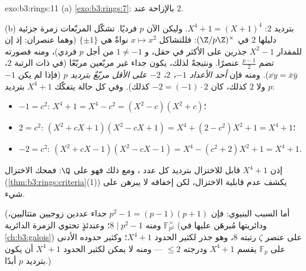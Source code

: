 \begin{solution}{exo:b3:rings:11}
(a) \cref{exo:b3:rings:7}: بالإزاحة  عند $2$.

(b) بترديد $2$: $X^4 + 1 = (X + 1)^4$. وليكن الآن $p$ فرديًا. تشكّل المربّعات
زمرة جزئية دليلها $2$ في $(\Z/p\Z)^\times$: فللتشاكل $x \mapsto x^2$ نواةٌ
هي $\{\pm 1\}$ (وهما عنصران: إذ إن للمقدار $X^2
- 1$ جذرين على الأكثر
في حقل، و $1 \neq -1$ من أجل $p$ فردي)، ومنه فصورته تضم
$\frac{p-1}2$ عنصرًا. ونتيجةً لذلك، يكون جداء غير مربّعين
مربّعًا (في  ذات الرتبة $2$، $\overline{xy} = \bar x\bar y$). ومنه فإن
\emph{أحد الأعداد $-1$، $2$، $-2$ على الأقل مربّعٌ بترديد $p$}
(فإذا لم يكن $-1$ ولا $2$ كذلك، كان $-2 = (-1)\cdot 2$ كذلك). وفي كل حالة
يتفكّك $X^4 + 1$ بترديد $p$:
\begin{itemize}
  \item $-1 = c^2$: \quad $X^4 + 1 = X^4 - c^2 = (X^2 - c)(X^2 +
        c)$؛
  \item $2 = c^2$: \quad $(X^2 + cX + 1)(X^2 - cX + 1) = X^4 + (2
        - c^2)X^2 + 1 = X^4 + 1$؛
  \item $-2 = c^2$: \quad $(X^2 + cX - 1)(X^2 - cX - 1) = X^4 -
        (c^2 + 2)X^2 + 1 = X^4 + 1$.
\end{itemize}
إذن $X^4+1$ قابل للاختزال بترديد كل عدد ، ومع ذلك فهو  على $\Q$: فمحك الاختزال (\cref{thm:b3:rings:criteria}(1)) يكشف
عدم قابلية الاختزال، لكن إخفاقه لا يبرهن على شيء.

(أما السبب البنيوي: فإن $p^2 - 1 = (p-1)(p+1)$ جداء عددين زوجيين متتاليين،
ومنه $8 \mid p^2 - 1$؛ وعندئذٍ تحتوي الزمرة الدائرية $\mathbb F_{p^2}^\times$
(ودائريتها مُبرهَن عليها في \cref{ch:b3:galois}) على عنصر $\zeta$ رتبته
$8$، وهو جذر لكثير الحدود $X^4 + 1$؛ وكثير حدوده الأدنى على $\mathbb
F_p$ يقسم
$X^4+1$ ودرجته $\leq 2$ --- ومنه لا يمكن لكثير الحدود $X^4+1$ أن يكون  بترديد $p$ أبدًا.)
\end{solution}

